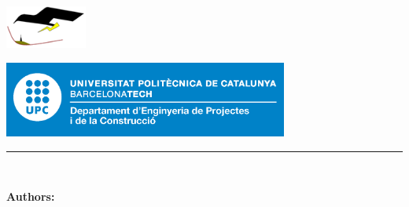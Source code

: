 
\thispagestyle{CoverPage}


\begin{center}\bf

\includegraphics[width=0.2\textwidth]{./doc_config/images/logo.png}\\
\large \researcherDept

\vspace{50pt}


\vspace{6pt}

\includegraphics[width=0.7\textwidth]{./doc_config/images/UPC_dpt}\\
{\large \School}

\vspace{50pt}

{\fontsize{25pt}{20pt}\selectfont \ProjectName}

\vspace{10pt}

{\fontsize{20pt}{20pt}\selectfont \Acronym}


\textcolor{UPC_blue}{\rule{\textwidth}{.6pt}}

{\Large \DocTypeI}\\
{\Large \DocTypeII}

\end{center}

\vspace{20pt}

\textbf{Authors:}\vspace{7pt}

